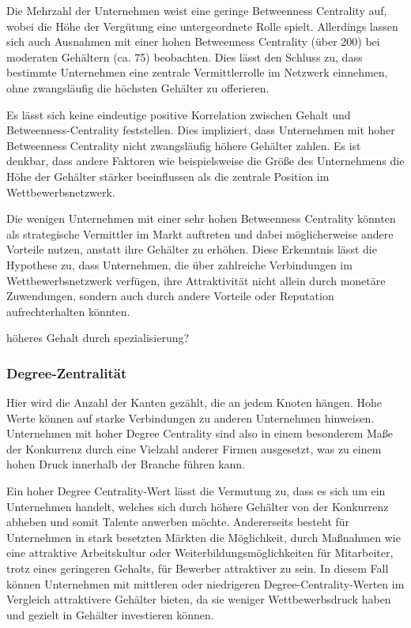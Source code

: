 \documentclass[
]{article}
\begin{document}
Die Mehrzahl der Unternehmen weist eine geringe Betweenness Centrality
auf, wobei die Höhe der Vergütung eine untergeordnete Rolle spielt.
Allerdings lassen sich auch Ausnahmen mit einer hohen Betweenness
Centrality (über 200) bei moderaten Gehältern (ca. 75) beobachten. Dies
lässt den Schluss zu, dass bestimmte Unternehmen eine zentrale
Vermittlerrolle im Netzwerk einnehmen, ohne zwangsläufig die höchsten
Gehälter zu offerieren.

Es lässt sich keine eindeutige positive Korrelation zwischen Gehalt und
Betweenness-Centrality feststellen. Dies impliziert, dass Unternehmen
mit hoher Betweenness Centrality nicht zwangsläufig höhere Gehälter
zahlen. Es ist denkbar, dass andere Faktoren wie beispielsweise die
Größe des Unternehmens die Höhe der Gehälter stärker beeinflussen als
die zentrale Position im Wettbewerbsnetzwerk.

Die wenigen Unternehmen mit einer sehr hohen Betweenness Centrality
könnten als strategische Vermittler im Markt auftreten und dabei
möglicherweise andere Vorteile nutzen, anstatt ihre Gehälter zu erhöhen.
Diese Erkenntnis lässt die Hypothese zu, dass Unternehmen, die über
zahlreiche Verbindungen im Wettbewerbsnetzwerk verfügen, ihre
Attraktivität nicht allein durch monetäre Zuwendungen, sondern auch
durch andere Vorteile oder Reputation aufrechterhalten könnten.

höheres Gehalt durch spezialisierung?

\subsubsection{Degree-Zentralität}\label{degree-zentralituxe4t}

Hier wird die Anzahl der Kanten gezählt, die an jedem Knoten hängen.
Hohe Werte können auf starke Verbindungen zu anderen Unternehmen
hinweisen. Unternehmen mit hoher Degree Centrality sind also in einem
besonderem Maße der Konkurrenz durch eine Vielzahl anderer Firmen
ausgesetzt, was zu einem hohen Druck innerhalb der Branche führen kann.

Ein hoher Degree Centrality-Wert lässt die Vermutung zu, dass es sich um
ein Unternehmen handelt, welches sich durch höhere Gehälter von der
Konkurrenz abheben und somit Talente anwerben möchte. Andererseits
besteht für Unternehmen in stark besetzten Märkten die Möglichkeit,
durch Maßnahmen wie eine attraktive Arbeitskultur oder
Weiterbildungsmöglichkeiten für Mitarbeiter, trotz eines geringeren
Gehalts, für Bewerber attraktiver zu sein. In diesem Fall können
Unternehmen mit mittleren oder niedrigeren Degree-Centrality-Werten im
Vergleich attraktivere Gehälter bieten, da sie weniger Wettbewerbsdruck
haben und gezielt in Gehälter investieren können.
\end{document}
